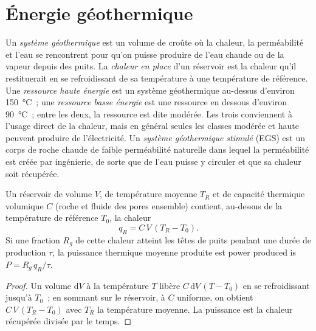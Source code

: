 \section{Énergie géothermique}\label{sec:b2:energy-geology:geothermal}

\begin{definition}\label{def:b2:energy-geology:geothermal}
Un \emph{système géothermique} est un volume de croûte où la chaleur,
la perméabilité et l'eau se rencontrent pour qu'on puisse produire de l'eau chaude ou de la vapeur depuis des puits. La
\emph{chaleur en place} d'un réservoir est la chaleur qu'il restituerait en se refroidissant
de sa température à une température de référence. Une \emph{ressource haute énergie} est
un système géothermique au-dessus d'environ \qty{150}{\celsius}~; une \emph{ressource basse énergie}
est une ressource en dessous d'environ \qty{90}{\celsius}~; entre les deux, la ressource est dite modérée. Les trois conviennent
à l'usage direct de la chaleur, mais en général seules les classes modérée et haute peuvent produire de l'électricité. Un
\emph{système géothermique stimulé} (EGS) est un corps de roche chaude de faible perméabilité naturelle
dans lequel la perméabilité est créée par ingénierie,
de sorte que de l'eau puisse y circuler et que sa chaleur soit récupérée.
\end{definition}

\begin{proposition}\label{prop:b2:energy-geology:heat}
Un réservoir de volume $V$, de température moyenne $T_R$ et de capacité thermique volumique $C$ (roche et fluide des pores ensemble)
contient, au-dessus de la température de référence $T_0$, la chaleur
\begin{equation}
q_R = C\,V\,(T_R - T_0) .
\label{eq:b2:energy-geology:heat}
\end{equation}
Si une fraction $R_g$ de cette chaleur atteint les têtes de puits pendant une durée de production $\tau$, la puissance thermique moyenne produite est
power produced is $P = R_g\,q_R/\tau$.
\end{proposition}

\begin{proof}
Un volume $\mathrm{d}V$ à la température $T$ libère $C\,\mathrm{d}V\,(T - T_0)$ en se refroidissant jusqu'à $T_0$~;
en sommant sur le réservoir, à $C$ uniforme, on obtient $C\,V\,(T_R - T_0)$ avec $T_R$ la température
moyenne. La puissance est la chaleur récupérée divisée par le temps.
\end{proof}

